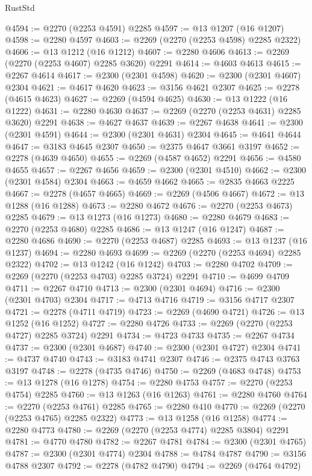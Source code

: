 \begin{lexlean}{RustStd}
\begin{coremodule}
{\begin{coremodule}
{{{{{{{{{{{{@4594 := @2270 (@2253 @4591) @2285
@4597 := @13 @1207 (@16 @1207)
@4598 := @2280 @4597
@4603 := @2269 (@2270 (@2253 @4598) @2285 @2322)
@4606 := @13 @1212 (@16 @1212)
@4607 := @2280 @4606
@4613 := @2269 (@2270 (@2253 @4607) @2285 @3620) @2291
@4614 := @4603 @4613
@4615 := @2267 @4614
@4617 := @2300 (@2301 @4598)
@4620 := @2300 (@2301 @4607) @2304
@4621 := @4617 @4620
@4623 := @3156 @4621 @2307
@4625 := @2278 (@4615 @4623)
@4627 := @2269 (@4594 @4625)
@4630 := @13 @1222 (@16 @1222)
@4631 := @2280 @4630
@4637 := @2269 (@2270 (@2253 @4631) @2285 @3620) @2291
@4638 := @4627 @4637
@4639 := @2267 @4638
@4641 := @2300 (@2301 @4591)
@4644 := @2300 (@2301 @4631) @2304
@4645 := @4641 @4644
@4647 := @3183 @4645 @2307
@4650 := @2375 @4647 @3661 @3197
@4652 := @2278 (@4639 @4650)
@4655 := @2269 (@4587 @4652) @2291
@4656 := @4580 @4655
@4657 := @2267 @4656
@4659 := @2300 (@2301 @4510)
@4662 := @2300 (@2301 @4584) @2304
@4663 := @4659 @4662
@4665 := @2835 @4663 @2225
@4667 := @2278 (@4657 @4665)
@4669 := @2269 (@4506 @4667)
@4672 := @13 @1288 (@16 @1288)
@4673 := @2280 @4672
@4676 := @2270 (@2253 @4673) @2285
@4679 := @13 @1273 (@16 @1273)
@4680 := @2280 @4679
@4683 := @2270 (@2253 @4680) @2285
@4686 := @13 @1247 (@16 @1247)
@4687 := @2280 @4686
@4690 := @2270 (@2253 @4687) @2285
@4693 := @13 @1237 (@16 @1237)
@4694 := @2280 @4693
@4699 := @2269 (@2270 (@2253 @4694) @2285 @2322)
@4702 := @13 @1242 (@16 @1242)
@4703 := @2280 @4702
@4709 := @2269 (@2270 (@2253 @4703) @2285 @3724) @2291
@4710 := @4699 @4709
@4711 := @2267 @4710
@4713 := @2300 (@2301 @4694)
@4716 := @2300 (@2301 @4703) @2304
@4717 := @4713 @4716
@4719 := @3156 @4717 @2307
@4721 := @2278 (@4711 @4719)
@4723 := @2269 (@4690 @4721)
@4726 := @13 @1252 (@16 @1252)
@4727 := @2280 @4726
@4733 := @2269 (@2270 (@2253 @4727) @2285 @3724) @2291
@4734 := @4723 @4733
@4735 := @2267 @4734
@4737 := @2300 (@2301 @4687)
@4740 := @2300 (@2301 @4727) @2304
@4741 := @4737 @4740
@4743 := @3183 @4741 @2307
@4746 := @2375 @4743 @3763 @3197
@4748 := @2278 (@4735 @4746)
@4750 := @2269 (@4683 @4748)
@4753 := @13 @1278 (@16 @1278)
@4754 := @2280 @4753
@4757 := @2270 (@2253 @4754) @2285
@4760 := @13 @1263 (@16 @1263)
@4761 := @2280 @4760
@4764 := @2270 (@2253 @4761) @2285
@4765 := @2280 @410
@4770 := @2269 (@2270 (@2253 @4765) @2285 @2322)
@4773 := @13 @1258 (@16 @1258)
@4774 := @2280 @4773
@4780 := @2269 (@2270 (@2253 @4774) @2285 @3804) @2291
@4781 := @4770 @4780
@4782 := @2267 @4781
@4784 := @2300 (@2301 @4765)
@4787 := @2300 (@2301 @4774) @2304
@4788 := @4784 @4787
@4790 := @3156 @4788 @2307
@4792 := @2278 (@4782 @4790)
@4794 := @2269 (@4764 @4792)
}}}}}}}}}}}}
\end{coremodule}}
\end{coremodule}
\end{lexlean}
